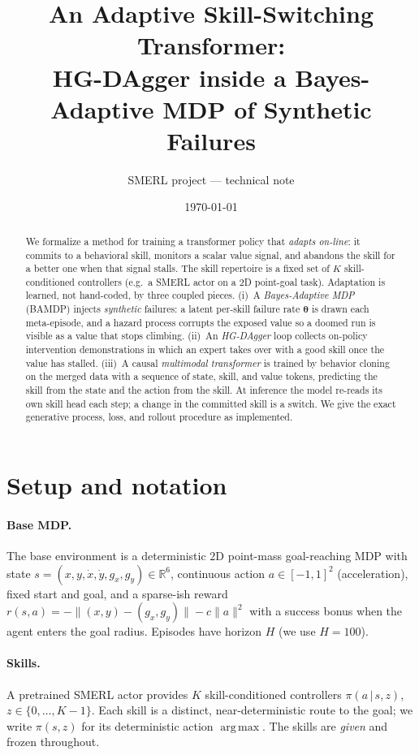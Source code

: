 \documentclass[11pt]{article}
\title{\textbf{An Adaptive Skill-Switching Transformer:\\
HG-DAgger inside a Bayes-Adaptive MDP of Synthetic Failures}}
\author{SMERL project --- technical note}
\date{\today}
\newcommand{\R}{\mathbb{R}}
\newcommand{\st}{s}
\newcommand{\theem}{\bm{\theta}}
\newcommand{\skill}{z}
\newcommand{\given}{\,\vert\,}
\newcommand{\argmax}{\operatorname*{arg\,max}}
\begin{document}
\maketitle

\begin{abstract}
We formalize a method for training a transformer policy that \emph{adapts on-line}:
it commits to a behavioral skill, monitors a scalar value signal, and abandons the
skill for a better one when that signal stalls. The skill repertoire is a fixed set
of $K$ skill-conditioned controllers (e.g.\ a SMERL actor on a $2$D point-goal task).
Adaptation is learned, not hand-coded, by three coupled pieces. (i)~A
\emph{Bayes-Adaptive MDP} (BAMDP) injects \emph{synthetic} failures: a latent
per-skill failure rate $\theem$ is drawn each meta-episode, and a hazard process
corrupts the exposed value so a doomed run is visible as a value that stops climbing.
(ii)~An \emph{HG-DAgger} loop collects on-policy intervention demonstrations in which
an expert takes over with a good skill once the value has stalled. (iii)~A causal
\emph{multimodal transformer} is trained by behavior cloning on the merged data with
a sequence of state, skill, and value tokens, predicting the skill from the state and
the action from the skill. At inference the model re-reads its own skill head each
step; a change in the committed skill is a switch. We give the exact generative
process, loss, and rollout procedure as implemented.
\end{abstract}

\tableofcontents

\section{Setup and notation}
\label{sec:setup}

\paragraph{Base MDP.}
The base environment is a deterministic $2$D point-mass goal-reaching MDP with state
$\st=(x,y,\dot x,\dot y,g_x,g_y)\in\R^{6}$, continuous action $a\in[-1,1]^2$
(acceleration), fixed start and goal, and a sparse-ish reward
$r(\st,a)=-\lVert (x,y)-(g_x,g_y)\rVert - c\lVert a\rVert^2$ with a success bonus when
the agent enters the goal radius. Episodes have horizon $H$ (we use $H=100$).

\paragraph{Skills.}
A pretrained SMERL actor provides $K$ skill-conditioned controllers
$\pi(a\given \st,\skill)$, $\skill\in\{0,\dots,K-1\}$. Each skill is a distinct,
near-deterministic route to the goal; we write $\pi(\st,\skill)$ for its deterministic
action $\argmax$. The skills are \emph{given} and frozen throughout.
\end{document}
